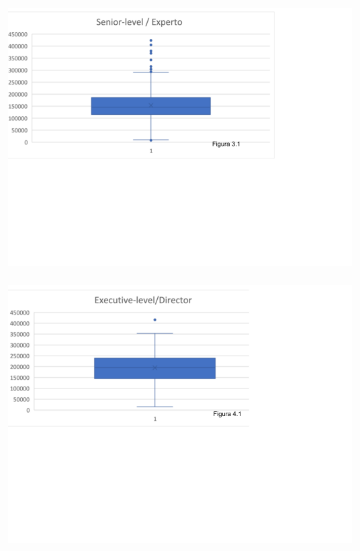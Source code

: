 \documentclass{article}
\begin{document}
	\begin{figure}[htbp] %
		\begin{subfigure}[b]{1.1\textwidth}
			\includegraphics[width=\textwidth]{FigurasTablas/figura3.1diagrama.png}
			\label{figura 3.1 diagrama}
		\end{subfigure}	
		
		\begin{subfigure}[b]{1.1\textwidth}
			\includegraphics[width=\textwidth]{FigurasTablas/figura4.1diagrama.png}
			\label{figura 4.1 diagrama}
		\end{subfigure}	
	\end{figure}
\end{document}
